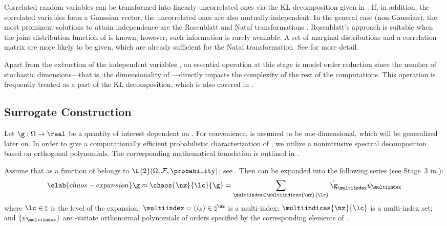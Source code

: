 Correlated random variables can be transformed into linearly uncorrelated ones
via the \ac{KL} decomposition given in . If, in addition,
the correlated variables form a Gaussian vector, the uncorrelated ones are also
mutually independent. In the general case (non-Gaussian), the most prominent
solutions to attain independence are the Rosenblatt \cite{rosenblatt1952} and
Nataf transformations \cite{liu1986}. Rosenblatt's approach is suitable when the
joint distribution function of \vu is known; however, such information is rarely
available. A set of marginal distributions and a correlation matrix are more
likely to be given, which are already sufficient for the Nataf transformation.
See  for more detail.

Apart from the extraction of the independent variables \vz, an essential
operation at this stage is model order reduction since the number of stochastic
dimensions---that is, the dimensionality of \vz---directly impacts the
complexity of the rest of the computations. This operation is frequently treated
as a part of the \ac{KL} decomposition, which is also covered in
.

\subsection{Surrogate Construction}

Let $\g: \Omega \to \real$ be a quantity of interest dependent on \vu. For
convenience, \g is assumed to be one-dimensional, which will be generalized
later on. In order to give a computationally efficient probabilistic
characterization of \g, we utilize a nonintrusive spectral decomposition based
on orthogonal polynomials. The corresponding mathematical foundation is outlined
in .

Assume that \g as a function of \vu belongs to $\L{2}(\Omega, \mathcal{F},
\probability)$; see . Then \g can be
expanded into the following series (see Stage~3 in ):
\begin{equation} \elab{chaos-expansion}
  \g \approx \chaos{\nz}{\lc}{\g} = \sum_{\multiindex \in \multiindices{\nz}{\lc}} \hat{\g}_{\multiindex} \psi_{\multiindex}
\end{equation}
where $\lc \in \natural$ is the level of the expansion; $\multiindex = (i_k) \in
\natural^\nz$ is a multi-index; $\multiindices{\nz}{\lc}$ is a multi-index set;
and $\{ \psi_{\multiindex} \}$ are \nz-variate orthonormal polynomials of orders
specified by the corresponding elements of \multiindex.

